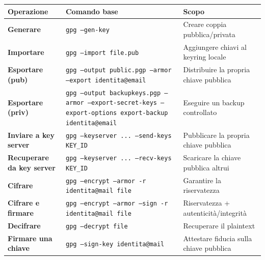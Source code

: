 \documentclass[12pt, a4paper]{report}
\begin{document}
\begin{table}[H]
	\centering
	\begin{tabular}{|p{3cm}|p{7cm}|p{4.5cm}|}
		\hline
		\textbf{Operazione} & \textbf{Comando base} & \textbf{Scopo} \\ \hline
		\textbf{Generare} & \texttt{gpg --gen-key} & Creare coppia pubblica/privata \\ \hline
		\textbf{Importare} & \texttt{gpg --import file.pub} & Aggiungere chiavi al keyring locale \\ \hline
		\textbf{Esportare (pub)} & \texttt{gpg --output public.pgp --armor --export identita@email} & Distribuire la propria chiave pubblica \\ \hline
		\textbf{Esportare (priv)} & \texttt{gpg --output backupkeys.pgp --armor --export-secret-keys --export-options export-backup identita@email} & Eseguire un backup controllato \\ \hline
		\textbf{Inviare a key server} & \texttt{gpg --keyserver ... --send-keys KEY\_ID} & Pubblicare la propria chiave pubblica \\ \hline
		\textbf{Recuperare da key server} & \texttt{gpg --keyserver ... --recv-keys KEY\_ID} & Scaricare la chiave pubblica altrui \\ \hline
		\textbf{Cifrare} & \texttt{gpg --encrypt --armor -r identita@mail file} & Garantire la riservatezza \\ \hline
		\textbf{Cifrare e firmare} & \texttt{gpg --encrypt --armor --sign -r identita@mail file} & Riservatezza + autenticità/integrità \\ \hline
		\textbf{Decifrare} & \texttt{gpg --decrypt file} & Recuperare il plaintext \\ \hline
		\textbf{Firmare una chiave} & \texttt{gpg --sign-key identita@mail} & Attestare fiducia sulla chiave pubblica \\ \hline
	\end{tabular}
\end{table}
	
\end{document}
